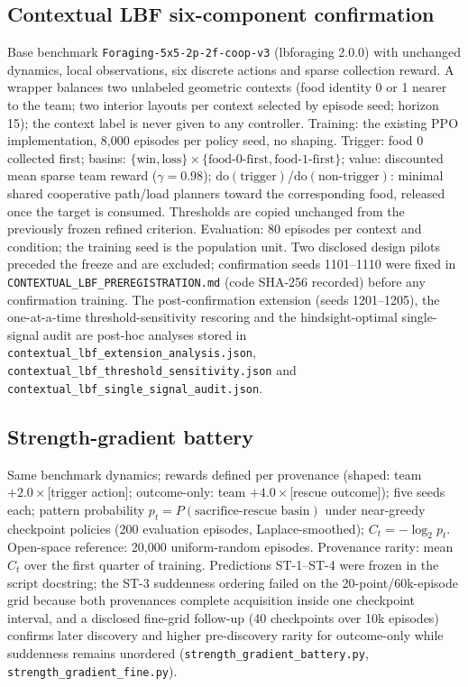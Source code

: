 \documentclass[11pt]{article}
\theoremstyle{definition}
\newcommand{\dO}[1]{\mathrm{do}(#1)}
\begin{document}
\subsection*{Contextual LBF six-component confirmation}
Base benchmark \texttt{Foraging-5x5-2p-2f-coop-v3} (lbforaging 2.0.0)
with unchanged dynamics, local observations, six discrete actions and
sparse collection reward. A wrapper balances two unlabeled geometric
contexts (food identity 0 or 1 nearer to the team; two interior
layouts per context selected by episode seed; horizon 15); the context
label is never given to any controller. Training: the existing PPO
implementation, 8{,}000 episodes per policy seed, no shaping.
Trigger: food 0 collected first; basins:
$\{\text{win},\text{loss}\}\times\{\text{food-0-first},
\text{food-1-first}\}$; value: discounted mean sparse team reward
($\gamma=0.98$); $\dO{\text{trigger}}$/$\dO{\text{non-trigger}}$:
minimal shared cooperative path/load planners toward the corresponding food,
released once the target is consumed. Thresholds are copied unchanged
from the previously frozen refined criterion. Evaluation: 80 episodes
per context and condition; the training seed is the population unit.
Two disclosed design pilots preceded the freeze and are excluded;
confirmation seeds 1101--1110 were fixed in
\texttt{CONTEXTUAL\_LBF\_PREREGISTRATION.md} (code SHA-256 recorded)
before any confirmation training. The post-confirmation extension
(seeds 1201--1205), the one-at-a-time threshold-sensitivity rescoring
and the hindsight-optimal single-signal audit are post-hoc analyses
stored in
\texttt{contextual\_lbf\_extension\_analysis.json},
\texttt{contextual\_lbf\_threshold\_sensitivity.json} and
\texttt{contextual\_lbf\_single\_signal\_audit.json}.

\subsection*{Strength-gradient battery}
Same benchmark dynamics; rewards defined per provenance (shaped: team
$+2.0\times$[trigger action]; outcome-only: team
$+4.0\times$[rescue outcome]); five seeds each; pattern probability
$p_t = P(\text{sacrifice-rescue basin})$ under near-greedy checkpoint
policies (200 evaluation episodes, Laplace-smoothed);
$C_t=-\log_2 p_t$. Open-space reference: 20{,}000 uniform-random
episodes. Provenance rarity: mean $C_t$ over the first quarter of
training. Predictions ST-1--ST-4 were frozen in the script docstring;
the ST-3 suddenness ordering failed on the 20-point/60k-episode grid
because both provenances complete acquisition inside one checkpoint
interval, and a disclosed fine-grid follow-up (40 checkpoints over
10k episodes) confirms later discovery and higher pre-discovery
rarity for outcome-only while suddenness remains unordered
(\texttt{strength\_gradient\_battery.py},
\texttt{strength\_gradient\_fine.py}).
\end{document}
